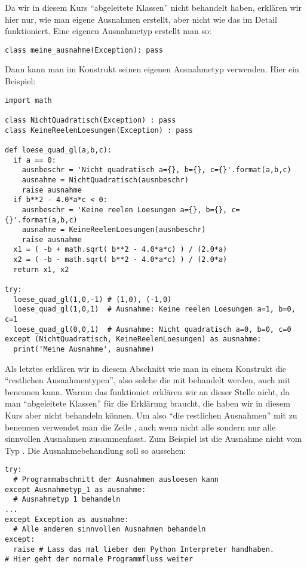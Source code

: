 Da wir in diesem Kurs  ``abgeleitete Klassen'' nicht behandelt haben, erklären wir hier nur, wie man eigene Ausnahmen erstellt, aber nicht wie das im Detail funktioniert.
Eine eigenen Ausnahmetyp erstellt man so:
\begin{lstlisting}
class meine_ausnahme(Exception): pass
\end{lstlisting}
Dann kann man im  Konstrukt seinen eigenen Ausnahmetyp verwenden.
Hier ein Beispiel:
\begin{lstlisting}
import math

class NichtQuadratisch(Exception) : pass
class KeineReelenLoesungen(Exception) : pass

def loese_quad_gl(a,b,c):
  if a == 0:
    ausnbeschr = 'Nicht quadratisch a={}, b={}, c={}'.format(a,b,c)
    ausnahme = NichtQuadratisch(ausnbeschr)
    raise ausnahme
  if b**2 - 4.0*a*c < 0:
    ausnbeschr = 'Keine reelen Loesungen a={}, b={}, c={}'.format(a,b,c)
    ausnahme = KeineReelenLoesungen(ausnbeschr)
    raise ausnahme
  x1 = ( -b + math.sqrt( b**2 - 4.0*a*c) ) / (2.0*a)
  x2 = ( -b - math.sqrt( b**2 - 4.0*a*c) ) / (2.0*a)
  return x1, x2

try:
  loese_quad_gl(1,0,-1) # (1,0), (-1,0)
  loese_quad_gl(1,0,1)  # Ausnahme: Keine reelen Loesungen a=1, b=0, c=1
  loese_quad_gl(0,0,1)  # Ausnahme: Nicht quadratisch a=0, b=0, c=0
except (NichtQuadratisch, KeineReelenLoesungen) as ausnahme:
  print('Meine Ausnahme', ausnahme)
\end{lstlisting}

Als letztes erklären wir in diesem Abschnitt wie man in einem  Konstrukt die ``restlichen Ausnahmentypen'', also solche die mit  behandelt werden, auch mit  benennen kann.
Warum das funktioniet erklären wir an dieser Stelle nicht, da man ``abgeleitete Klassen'' für die Erklärung braucht, die haben wir in diesem Kurs aber nicht behandeln können.
Um also ``die restlichen Ausnahmen'' mit  zu benennen verwendet man die Zeile , auch wenn  nicht alle sondern nur alle sinnvollen Ausnahmen zusammenfasst.
Zum Beispiel ist die Ausnahme  nicht vom Typ .
Die Ausnahmebehandlung soll so aussehen:
\begin{lstlisting}
try:
  # Programmabschnitt der Ausnahmen ausloesen kann
except Ausnahmetyp_1 as ausnahme:
  # Ausnahmetyp 1 behandeln
...
except Exception as ausnahme:
  # Alle anderen sinnvollen Ausnahmen behandeln
except:
  raise # Lass das mal lieber den Python Interpreter handhaben.
# Hier geht der normale Programmfluss weiter
\end{lstlisting}
